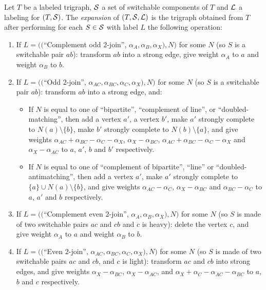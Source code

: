 \documentclass[11 pt] {article}
\begin{document}
Let $T$ be a labeled trigraph, $\cal S$ a set of switchable components
of $T$ and $\cal L$ a labeling for $(T, {\cal S})$.  The
\emph{expansion} of $(T, {\cal S}, {\cal L})$ is the trigraph obtained
from $T$ after performing for each $S \in {\cal S}$ with label $L$ the
following operation:

\begin{enumerate}
\item If $L = (($``Complement odd $2$-join'', $\alpha_A, \alpha_B,
  \alpha_X), N)$ for some $N$ (so $S$ is a switchable pair $ab$):
  transform $ab$ into a strong edge, give weight $\alpha_A$ to 
  $a$ and weight $\alpha_B$ to $b$.



\item If  $L = (($``Odd $2$-join'', $\alpha_{AC}, \alpha_{BC},
  \alpha_C, \alpha_X), N)$ for some $N$ (so $S$ is a switchable pair
  $ab$): transform $ab$ into a strong edge, and:
  \begin{itemize}  
  \item If $N$ is equal to one of ``bipartite'', ``complement of
    line'', or ``doubled-matching'', then add a vertex $a'$, a vertex
    $b'$, make $a'$ strongly complete to $N(a)\setminus \{b\}$, make
    $b'$ strongly complete to $N(b)\setminus \{a\}$, and give weights
    $\alpha_{AC} + \alpha_{BC} - \alpha_{C} - \alpha_{X}$, $\alpha_X -
    \alpha_{BC}$, $\alpha_{AC} + \alpha_{BC} - \alpha_{C} -
    \alpha_{X}$ and $\alpha_X - \alpha_{AC}$ to $a$, $a'$, $b$ and
    $b'$ respectively.
  \item If $N$ is equal to one of ``complement of bipartite'',
    ``line'' or ``doubled-antimatching'', then add a vertex $a'$, make
    $a'$ strongly complete to $\{a\} \cup N(a) \setminus \{b\}$, and
    give weights $\alpha_{AC} - \alpha_{C}$, $\alpha_{X} -
    \alpha_{BC}$ and $\alpha_{BC} - \alpha_{C}$ to $a$, $a'$ and $b$
    respectively.
  \end{itemize}

\item If $L = (($``Complement even $2$-join'', $\alpha_A, \alpha_B,
  \alpha_X), N)$ for some $N$ (so $S$ is made of two switchable pairs
  $ac$ and $cb$ and $c$ is heavy): delete the vertex $c$, and give weight 
  $\alpha_A$ to $a$ and   weight $\alpha_B$ to $b$.

\item If  $L = (($``Even $2$-join'', $\alpha_{AC}, \alpha_{BC},
  \alpha_C, \alpha_X), N)$ for some $N$ (so $S$ is made of two
  switchable pairs $ac$ and $cb$, and $c$ is light): transform  $ac$
  and $cb$ into strong edges, and give weights $\alpha_X -
  \alpha_{BC}$, $\alpha_X - \alpha_{AC}$, and $\alpha_{X} + \alpha_{C}
  - \alpha_{AC} - \alpha_{BC}$ to $a$, $b$ and $c$ respectively.

\end{enumerate}
\end{document}
